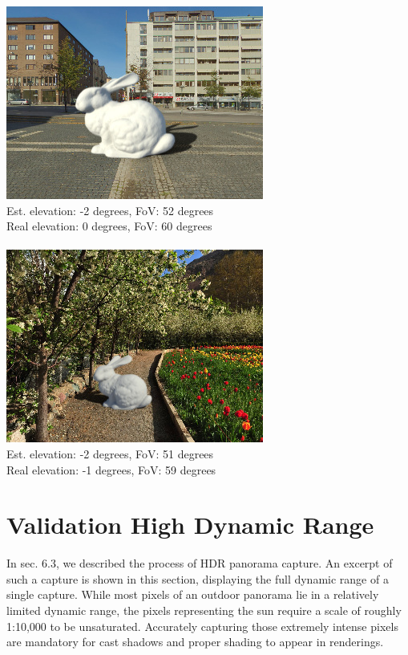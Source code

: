 \begin{multicols}{2}
\includegraphics[width=\mywidth]{pano_aizkyyutyizoaz_002.jpg}\\
\small Est. elevation: -2 degrees, FoV: 52 degrees\\
\small Real elevation: 0 degrees, FoV: 60 degrees\\
~\\
\includegraphics[width=\mywidth]{pano_ajlwcdjsjcaemh.jpg}\\
\small Est. elevation: -2 degrees, FoV: 51 degrees\\
\small Real elevation: -1 degrees, FoV: 59 degrees\\

\end{multicols}

\protect\hypertarget{HDRcaptures}{}{}

\hypertarget{validation-high-dynamic-range}{%
\section{Validation High Dynamic
Range}\label{validation-high-dynamic-range}}

In sec. 6.3, we described the process of HDR panorama capture. An
excerpt of such a capture is shown in this section, displaying the full
dynamic range of a single capture. While most pixels of an outdoor
panorama lie in a relatively limited dynamic range, the pixels
representing the sun require a scale of roughly 1:10,000 to be
unsaturated. Accurately capturing those extremely intense pixels are
mandatory for cast shadows and proper shading to appear in renderings.

